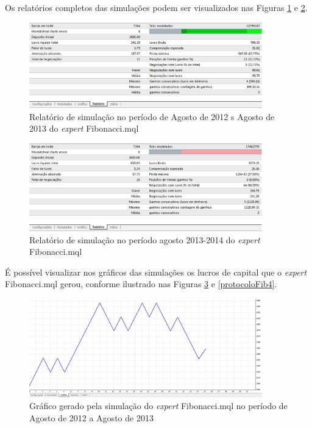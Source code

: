 Os relatórios completos das simulações podem ser visualizados nas Figuras \ref{protocoloFib} e \ref{protocoloFib2}.

\begin{figure}[H]
\centering
\includegraphics[width=0.9\textwidth]{figuras/protocoloFib}
\caption{Relatório de simulação no período de Agosto de 2012 s Agosto de 2013 do \textit{expert} Fibonacci.mql}
\label{protocoloFib}
\end{figure}

\begin{figure}[H]
\centering
\includegraphics[width=0.9\textwidth]{figuras/protocoloFib2}
\caption{Relatório de simulação no período agosto 2013-2014 do \textit{expert} Fibonacci.mql}
\label{protocoloFib2}
\end{figure}

É possível visualizar nos gráficos das simulações os lucros de capital que o \textit{expert} Fibonacci.mql gerou, conforme ilustrado nas Figuras \ref{protocoloFib3} e \ref{protocoloFib4}.

\begin{figure}[H]
\centering
\includegraphics[width=0.9\textwidth]{figuras/protocoloFib3}
\caption{Gráfico gerado pela simulação do \textit{expert} Fibonacci.mql no período de Agosto de 2012 a Agosto de 2013}
\label{protocoloFib3}
\end{figure}

